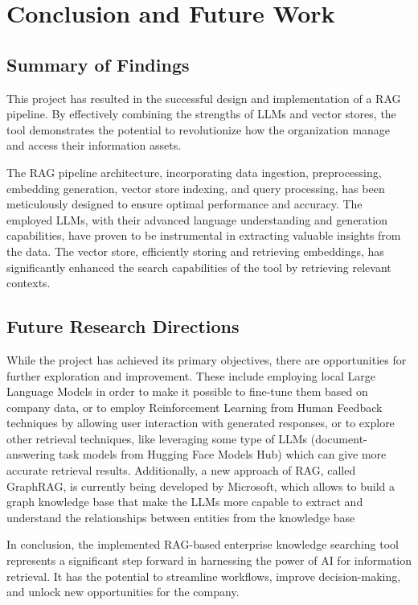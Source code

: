 \chapter{Conclusion and Future Work}

\section{Summary of Findings}
This project has resulted in the successful design and implementation of a RAG pipeline. By effectively combining the strengths of LLMs and vector stores, the tool demonstrates the potential to revolutionize how the organization manage and access their information assets.

The RAG pipeline architecture, incorporating data ingestion, preprocessing, embedding generation, vector store indexing, and query processing, has been meticulously designed to ensure optimal performance and accuracy. The employed LLMs, with their advanced language understanding and generation capabilities, have proven to be instrumental in extracting valuable insights from the data. The vector store, efficiently storing and retrieving embeddings, has significantly enhanced the search capabilities of the tool by retrieving relevant contexts.

\section{Future Research Directions}
While the project has achieved its primary objectives, there are opportunities for further exploration and improvement. These include employing local Large Language Models in order to make it possible to fine-tune them based on company data, or to employ Reinforcement Learning from Human Feedback techniques by allowing user interaction with generated responses, or to explore other retrieval techniques, like leveraging some type of LLMs (document-answering task models from Hugging Face Models Hub) which can give more accurate retrieval results. Additionally, a new approach of RAG, called GraphRAG, is currently being developed by Microsoft, which allows to build a graph knowledge base that make the LLMs more capable to extract and understand the relationships between entities from the knowledge base

In conclusion, the implemented RAG-based enterprise knowledge searching tool represents a significant step forward in harnessing the power of AI for information retrieval. It has the potential to streamline workflows, improve decision-making, and unlock new opportunities for the company.